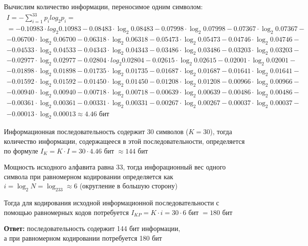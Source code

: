 \documentclass[a4paper,12pt]{article}
\begin{document}
  Вычислим количество информации, переносимое одним символом:
  \begin{multline}
    I = -\sum\limits_{i = 1}^{33}p_ilog_2p_i = \\
    = -0.10983\cdot log_2{0.10983} - 0.08483\cdot \log_2{0.08483}
    -0.07998\cdot \log_2{0.07998} - 0.07367\cdot \log_2{0.07367} - \\
    - 0.06700 \cdot \log_2{0.06700 } - 0.06318\cdot \log_2{0.06318} -
    0.05473\cdot \log_2{0.05473} - 0.04746\cdot \log_2{0.04746} -\\
    - 0.04533\cdot \log_2{0.04533} - 0.04343\cdot \log_2{0.04343} -
    0.03486\cdot \log_2{0.03486} - 0.03203\cdot \log_2{0.03203} - \\
    - 0.02977\cdot \log_2{0.02977} - 0.02804\cdot log_2{0.02804} -
    0.02615\cdot \log_2{0.02615} - 0.02001\cdot\log_2{0.02001} -\\
    - 0.01898\cdot\log_2{0.01898} - 0.01735\cdot\log_2{0.01735} -
    0.01687\cdot\log_2{0.01687} - 0.01641 \cdot\log_2{0.01641 } -\\
    - 0.01592\cdot\log_2{0.01592} - 0.01450\cdot \log_2{0.01450} -
    0.01208\cdot\log_2{0.01208} - 0.00966\cdot\log_2{0.00966} -\\
    - 0.00940\cdot\log_2{0.00940} - 0.00718\cdot\log_2{0.00718} -
    0.00639\cdot\log_2{0.00639} - 0.00486\cdot\log_2{0.00486} - \\
    - 0.00361\cdot\log_2{0.00361} - 0.00331\cdot\log_2{0.00331} -
    0.00267\cdot\log_2{0.00267} - 0.00037\cdot\log_2{0.00037} - \\
    - 0.00013\cdot\log_2{0.00013} \approx 4.46 \text{ бит}
  \end{multline}
  
  Информационная последовательность содержит 30 символов ($K = 30$), тогда количество информации,
  содержащееся в этой последовательности, определяется по формуле
  $I_K = K\cdot I = 30 \cdot 4.46 \text{ бит } \approx 144$ бит

  Мощность исходного алфавита равна 33, тогда
  инфорационный вес одного символа при равномерном кодировании определяется как
  $i = \log_2N = \log_233 \approx 6$ (округление в большую сторону)

  Тогда для кодирования исходной информационной последовательности с помощью равномерных
  кодов потребуется $I_{KP} = K\cdot i = 30 \cdot 6 \text{ бит } = 180$ бит

  \begin{flushright}
    \textbf{Ответ:} последовательность содержит 144 бит информации, \\
    а при равномерном кодировании потребуется 180 бит
  \end{flushright}
\end{document}
